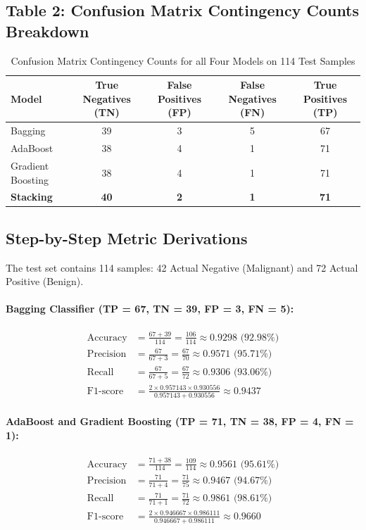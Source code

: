 \documentclass[12pt,a4paper]{article}
\begin{document}
\subsection*{Table 2: Confusion Matrix Contingency Counts Breakdown}

\begin{table}[H]
\centering
\begin{tabular}{lcccc}
\toprule
\textbf{Model} & \textbf{True Negatives (TN)} & \textbf{False Positives (FP)} & \textbf{False Negatives (FN)} & \textbf{True Positives (TP)} \\
\midrule
Bagging & 39 & 3 & 5 & 67 \\
AdaBoost & 38 & 4 & 1 & 71 \\
Gradient Boosting & 38 & 4 & 1 & 71 \\
\textbf{Stacking} & \textbf{40} & \textbf{2} & \textbf{1} & \textbf{71} \\
\bottomrule
\end{tabular}
\caption{Confusion Matrix Contingency Counts for all Four Models on 114 Test Samples}
\label{tab:exp6_cm_breakdown}
\end{table}

\subsection*{Step-by-Step Metric Derivations}

The test set contains 114 samples: 42 Actual Negative (Malignant) and 72 Actual Positive (Benign).

\paragraph{Bagging Classifier (TP = 67, TN = 39, FP = 3, FN = 5):}
\begin{align}
\text{Accuracy} &= \frac{67 + 39}{114} = \frac{106}{114} \approx 0.9298 \text{ (92.98\%)} \\
\text{Precision} &= \frac{67}{67 + 3} = \frac{67}{70} \approx 0.9571 \text{ (95.71\%)} \\
\text{Recall} &= \frac{67}{67 + 5} = \frac{67}{72} \approx 0.9306 \text{ (93.06\%)} \\
\text{F1-score} &= \frac{2 \times 0.957143 \times 0.930556}{0.957143 + 0.930556} \approx 0.9437
\end{align}

\paragraph{AdaBoost and Gradient Boosting (TP = 71, TN = 38, FP = 4, FN = 1):}
\begin{align}
\text{Accuracy} &= \frac{71 + 38}{114} = \frac{109}{114} \approx 0.9561 \text{ (95.61\%)} \\
\text{Precision} &= \frac{71}{71 + 4} = \frac{71}{75} \approx 0.9467 \text{ (94.67\%)} \\
\text{Recall} &= \frac{71}{71 + 1} = \frac{71}{72} \approx 0.9861 \text{ (98.61\%)} \\
\text{F1-score} &= \frac{2 \times 0.946667 \times 0.986111}{0.946667 + 0.986111} \approx 0.9660
\end{align}
\end{document}
